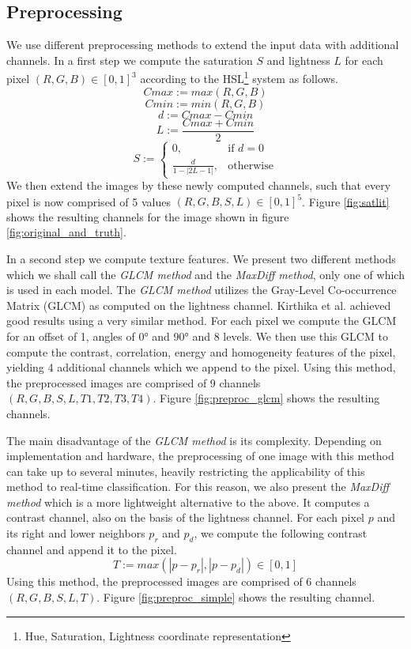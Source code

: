 \documentclass[10pt,conference,compsocconf]{IEEEtran}
\begin{document}
\subsection{Preprocessing}

We use different preprocessing methods to extend the input data with additional channels.
In a first step we compute the saturation $S$ and lightness $L$ for each pixel $(R,G,B) \in [0,1]^3$ according to the HSL\footnote{Hue, Saturation, Lightness coordinate representation} system as follows.
$$ Cmax := max(R,G,B) $$
$$ Cmin := min(R,G,B) $$
$$d := Cmax - Cmin$$
$$ L := \frac{Cmax + Cmin}{2} $$
\[
S :=
\begin{cases}
	0, & \text{if } d = 0\\
	\frac{d}{1-|2L-1|}, & \text{otherwise}
\end{cases}
\]
We then extend the images by these newly computed channels, such that every pixel is now comprised of 5 values $(R,G,B,S,L) \in [0,1]^5$. Figure \ref{fig:satlit} shows the resulting channels for the image shown in figure \ref{fig:original_and_truth}.

In a second step we compute texture features.
We present two different methods which we shall call the \emph{GLCM method} and the \emph{MaxDiff method}, only one of which is used in each model.
The \emph{GLCM method} utilizes the Gray-Level Co-occurrence Matrix (GLCM) \cite{glcm} as computed on the lightness channel.
Kirthika et al. \cite{kirthika2011automated} achieved good results using a very similar method.
For each pixel we compute the GLCM for an offset of 1, angles of 0° and 90° and 8 levels.
We then use this GLCM to compute the contrast, correlation, energy and homogeneity features of the pixel, yielding 4 additional channels which we append to the pixel.
Using this method, the preprocessed images are comprised of 9 channels $(R,G,B,S,L,T1,T2,T3,T4)$.
Figure \ref{fig:preproc_glcm} shows the resulting channels.

The main disadvantage of the \emph{GLCM method} is its complexity.
Depending on implementation and hardware, the preprocessing of one image with this method can take up to several minutes, heavily restricting the applicability of this method to real-time classification.
For this reason, we also present the \emph{MaxDiff method} which is a more lightweight alternative to the above.
It computes a contrast channel, also on the basis of the lightness channel.
For each pixel $p$ and its right and lower neighbors $p_r$ and $p_d$, we compute the following contrast channel and append it to the pixel.
$$ T := max(|p-p_r|,|p-p_d|) \in [0,1] $$
Using this method, the preprocessed images are comprised of 6 channels $(R,G,B,S,L,T)$.
Figure \ref{fig:preproc_simple} shows the resulting channel.
\end{document}
